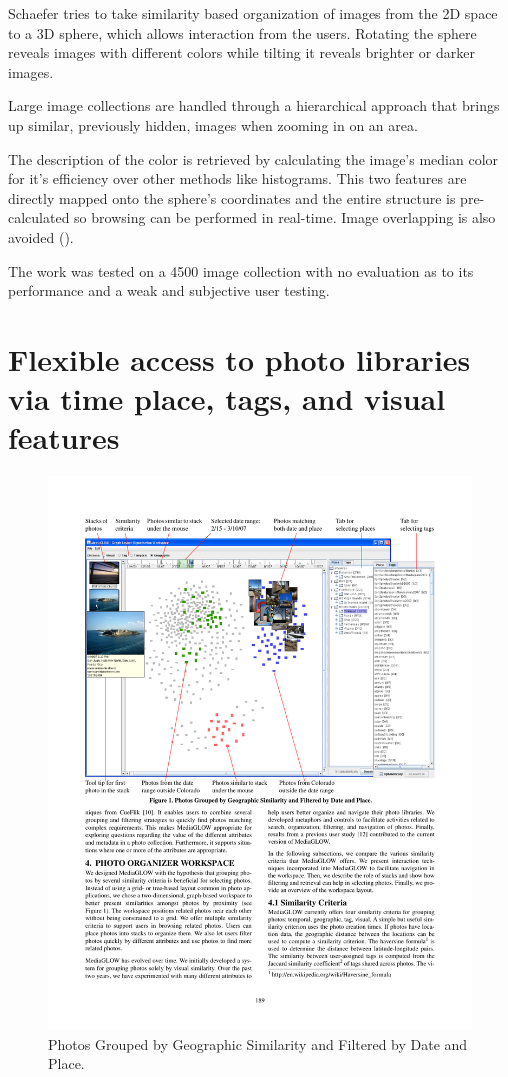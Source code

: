 Schaefer \cite{Schaefer:2010p1871} tries to take similarity based organization of images from the 2D space to a 3D sphere, which allows interaction from the users. Rotating the sphere reveals images with different colors while tilting it reveals brighter or darker images.

Large image collections are handled through a hierarchical approach that brings up similar, previously hidden, images when zooming in on an area.

The description of the color is retrieved by calculating the image's median color for it's efficiency over other methods like histograms. This two features are directly mapped onto the sphere's coordinates and the entire structure is pre-calculated so browsing can be performed in real-time. Image overlapping is also avoided ().

The work was tested on a 4500 image collection with no evaluation as to its performance and a weak and subjective user testing.



\section{Flexible access to photo libraries via time place, tags, and visual features} %
\label{sub:Girgensohn}
\begin{figure}[ht]
	\centering
		\includegraphics[width=\textwidth]{imgs-RelatedWork/Girgensohn1.pdf}
	\caption{Photos Grouped by Geographic Similarity and Filtered by Date and Place.}
	\label{fig:girgensohn}
\end{figure}

